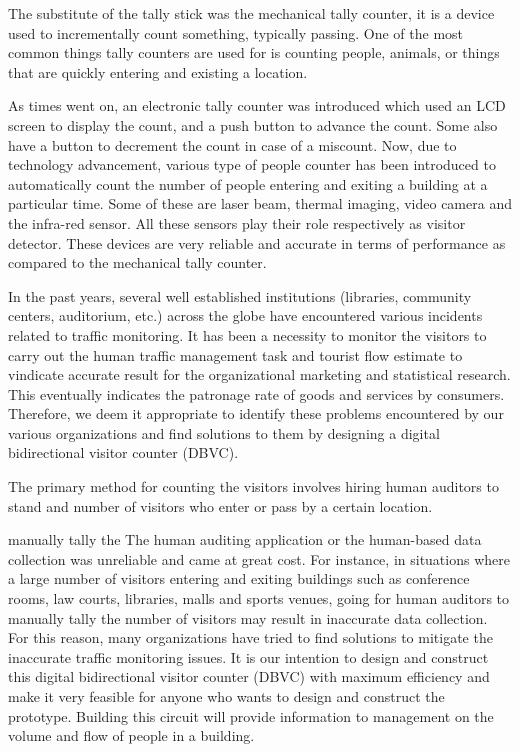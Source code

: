 \documentclass{article}
\begin{document}
The substitute of the tally stick was the mechanical tally counter, it is a device used to incrementally count
something, typically passing. One of the most common things tally counters are used for is counting people,
animals, or things that are quickly entering and existing a location.\\

\par
As times went on, an electronic tally counter was introduced which used an LCD screen to display the count, and
a push button to advance the count. Some also have a button to decrement the count in case of a miscount. Now,
due to technology advancement, various type of people counter has been introduced to automatically count the
number of people entering and exiting a building at a particular time. Some of these are laser beam, thermal
imaging, video camera and the infra-red sensor. All these sensors play their role respectively as visitor detector.
These devices are very reliable and accurate in terms of performance as compared to the mechanical tally
counter.\\

\par
In the past years, several well established institutions (libraries, community centers, auditorium, etc.) across the
globe have encountered various incidents related to traffic monitoring. It has been a necessity to monitor the
visitors to carry out the human traffic management task and tourist flow estimate to vindicate accurate result for
the organizational marketing and statistical research. This eventually indicates the patronage rate of goods and
services by consumers. Therefore, we deem it appropriate to identify these problems encountered by our various
organizations and find solutions to them by designing a digital bidirectional visitor counter (DBVC).\\

\par
The primary method for counting the visitors involves hiring human auditors to stand and
number of visitors who enter or pass by a certain location.\\

\par
manually tally the
The human auditing application or the human-based data collection was unreliable and came at great cost. For
instance, in situations where a large number of visitors entering and exiting buildings such as conference rooms,
law courts, libraries, malls and sports venues, going for human auditors to manually tally the number of visitors
may result in inaccurate data collection. For this reason, many organizations have tried to find solutions to
mitigate the inaccurate traffic monitoring issues. It is our intention to design and construct this digital
bidirectional visitor counter (DBVC) with maximum efficiency and make it very feasible for anyone who wants
to design and construct the prototype. Building this circuit will provide information to management on the
volume and flow of people in a building.\\
\end{document}
